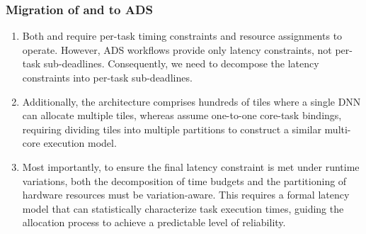 \subsubsection{Migration of \CyclicName and \TpFirstName to \hwname ADS}\label{subsec:migrate_step_by_step}
\begin{enumerate}[leftmargin=*, nosep]
  \item Both \CyclicName and \TpFirstName require per-task timing constraints and resource assignments to operate. However, ADS workflows provide only \ETEB latency constraints, not per-task sub-deadlines. Consequently, we need to decompose the \ETEB latency constraints into per-task sub-deadlines.
  \item Additionally, the \hwname architecture comprises hundreds of tiles where a single DNN can allocate multiple tiles, whereas \CyclicName assume one-to-one core-task bindings, requiring dividing tiles into multiple partitions to construct a similar multi-core execution model. 
  \item Most importantly, to ensure the final \ETEB latency constraint is met under runtime variations, both the decomposition of time budgets and the partitioning of hardware resources must be variation-aware. This requires a formal latency model that can statistically characterize task execution times, guiding the allocation process to achieve a predictable level of reliability.
\end{enumerate}

